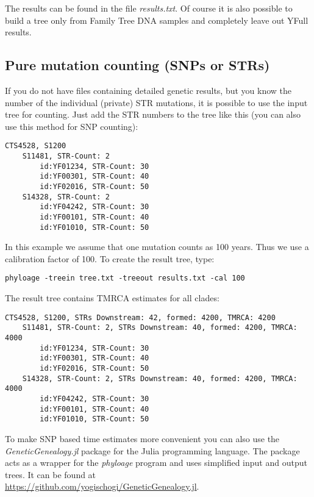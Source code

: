 The results can be found in the file \emph{results.txt}.
Of course it is also possible to build a tree only from
Family Tree DNA samples and completely leave out YFull
results.


\subsection{Pure mutation counting (SNPs or STRs)}

If you do not have files containing detailed genetic results,
but you know the number of the individual (private) STR
mutations, it is possible to use the input tree for counting.
Just add the STR numbers to the tree like this (you can also
use this method for SNP counting):

\begin{verbatim}
CTS4528, S1200
    S11481, STR-Count: 2
        id:YF01234, STR-Count: 30
        id:YF00301, STR-Count: 40
        id:YF02016, STR-Count: 50
    S14328, STR-Count: 2
        id:YF04242, STR-Count: 30
        id:YF00101, STR-Count: 40
        id:YF01010, STR-Count: 50
\end{verbatim}


In this example we assume that one mutation counts as 100
years. Thus we use a calibration factor of 100. To create
the result tree, type:

\vspace{1ex}\noindent
\texttt{phyloage -treein tree.txt -treeout results.txt -cal 100}
\vspace{1ex}

\noindent
The result tree contains TMRCA estimates for all clades:

\begin{verbatim}
CTS4528, S1200, STRs Downstream: 42, formed: 4200, TMRCA: 4200
    S11481, STR-Count: 2, STRs Downstream: 40, formed: 4200, TMRCA: 4000
        id:YF01234, STR-Count: 30
        id:YF00301, STR-Count: 40
        id:YF02016, STR-Count: 50
    S14328, STR-Count: 2, STRs Downstream: 40, formed: 4200, TMRCA: 4000
        id:YF04242, STR-Count: 30
        id:YF00101, STR-Count: 40
        id:YF01010, STR-Count: 50
\end{verbatim}

To make SNP based time estimates more convenient you can also use
the \emph{GeneticGenealogy.jl} package for the Julia programming language.
The package acts as a wrapper for the \emph{phyloage} program
and uses simplified input and output trees. It can be found at\\
\href{https://github.com/yogischogi/GeneticGenealogy.jl}{https://github.com/yogischogi/GeneticGenealogy.jl}.





